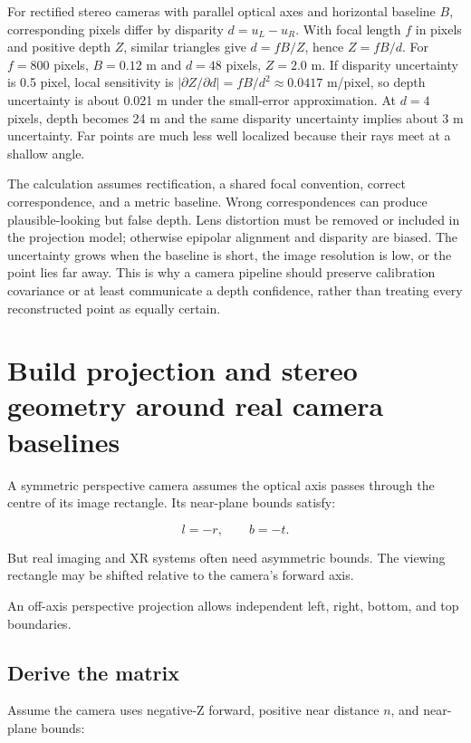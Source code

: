 For rectified stereo cameras with parallel optical axes and horizontal baseline \(B\), corresponding pixels differ by disparity \(d=u_L-u_R\). With focal length \(f\) in pixels and positive depth \(Z\), similar triangles give \(d=fB/Z\), hence \(Z=fB/d\). For \(f=800\) pixels, \(B=0.12\) m and \(d=48\) pixels, \(Z=2.0\) m. If disparity uncertainty is 0.5 pixel, local sensitivity is \(|\partial Z/\partial d|=fB/d^2\approx0.0417\) m/pixel, so depth uncertainty is about 0.021 m under the small-error approximation. At \(d=4\) pixels, depth becomes 24 m and the same disparity uncertainty implies about 3 m uncertainty. Far points are much less well localized because their rays meet at a shallow angle.

The calculation assumes rectification, a shared focal convention, correct correspondence, and a metric baseline. Wrong correspondences can produce plausible-looking but false depth. Lens distortion must be removed or included in the projection model; otherwise epipolar alignment and disparity are biased. The uncertainty grows when the baseline is short, the image resolution is low, or the point lies far away. This is why a camera pipeline should preserve calibration covariance or at least communicate a depth confidence, rather than treating every reconstructed point as equally certain.

\section{Build projection and stereo geometry around real camera baselines}\label{02-foundations-ii-ch035-build-projection-and-stereo-geometry-around-real-camera-baselines}

A symmetric perspective camera assumes the optical axis passes through the centre of its image rectangle. Its near-plane bounds satisfy:

\[ l=-r,\qquad b=-t. \]

But real imaging and XR systems often need asymmetric bounds. The viewing rectangle may be shifted relative to the camera's forward axis.

An off-axis perspective projection allows independent left, right, bottom, and top boundaries.

\subsection{Derive the matrix}\label{02-foundations-ii-ch035-derive-the-matrix}

Assume the camera uses negative-Z forward, positive near distance \(n\), and near-plane bounds:

